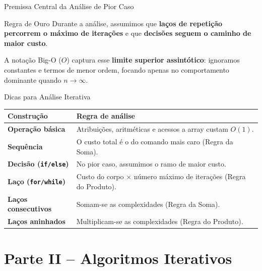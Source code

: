 \documentclass[aspectratio=169]{beamer}
\begin{document}
\begin{frame}{Premissa Central da Análise de Pior Caso}
    \begin{alertblock}{Regra de Ouro}
        Durante a análise, assumimos que \textbf{laços de repetição percorrem o máximo de iterações} e que \textbf{decisões seguem o caminho de maior custo}.
    \end{alertblock}
    
    \vspace{0.4cm}
    A notação Big-O ($O$) captura esse \textbf{limite superior assintótico}: ignoramos constantes e termos de menor ordem, focando apenas no comportamento dominante quando $n \to \infty$.
\end{frame}

\begin{frame}[shrink]{Dicas para Análise Iterativa}
    \begin{center}
    \renewcommand{\arraystretch}{1.4}
    \begin{tabular}{>{\bfseries}l p{8.5cm}}
        \toprule
        Construção & Regra de análise \\
        \midrule
        Operação básica & Atribuições, aritméticas e acessos a array custam $O(1)$. \\
        Sequência & O custo total é o do comando mais caro (Regra da Soma). \\
        Decisão (\texttt{if/else}) & No pior caso, assumimos o ramo de maior custo. \\
        Laço (\texttt{for/while}) & Custo do corpo $\times$ número máximo de iterações (Regra do Produto). \\
        Laços consecutivos & Somam-se as complexidades (Regra da Soma). \\
        Laços aninhados & Multiplicam-se as complexidades (Regra do Produto). \\
        \bottomrule
    \end{tabular}
    \end{center}
\end{frame}

\section{Parte II -- Algoritmos Iterativos}
\end{document}
